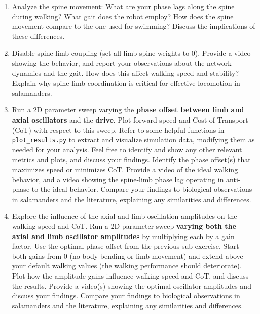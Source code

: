 \documentclass{cmc}
\begin{document}
\begin{enumerate}
  \item Analyze the spine movement: What are your phase lags along the spine during walking?
        What gait does the robot employ?
        How does the spine movement compare to the one used for swimming?
        Discuss the implications of these differences.

  \item Disable spine-limb coupling (set all limb-spine weights to 0).
        Provide a video showing the behavior, and report your observations about the network dynamics and the gait.
        How does this affect walking speed and stability?
        Explain why spine-limb coordination is critical for effective locomotion in salamanders.

  \item Run a 2D parameter sweep varying the \textbf{phase offset between limb and axial oscillators} and the \textbf{drive}.
        Plot forward speed and Cost of Transport (CoT) with respect to this sweep.
        Refer to some helpful functions in \texttt{plot\_results.py} to extract and visualize simulation data, modifying them as needed for your analysis.
        Feel free to identify and show any other relevant metrics and plots, and discuss your findings.
        Identify the phase offset(s) that maximizes speed or minimizes CoT.
        Provide a video of the ideal walking behavior, and a video showing the spine-limb phase lag operating in anti-phase to the ideal behavior.
        Compare your findings to biological observations in salamanders and the literature, explaining any similarities and differences.

  \item Explore the influence of the axial and limb oscillation amplitudes on the walking speed and CoT.
        Run a 2D parameter sweep \textbf{varying both the axial and limb oscillator amplitudes} by multiplying each by a gain factor.
        Use the optimal phase offset from the previous sub-exercise.
        Start both gains from 0 (no body bending or limb movement) and extend above your default walking values (the walking performance should deteriorate).
        Plot how the amplitude gains influence walking speed and CoT, and discuss the results.
        Provide a video(s) showing the optimal oscillator amplitudes and discuss your findings.
        Compare your findings to biological observations in salamanders and the literature, explaining any similarities and differences.
\end{enumerate}
\end{document}
